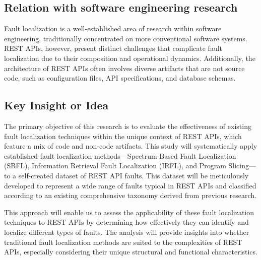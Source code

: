 \documentclass[conference]{IEEEtran}
\newcommand{\todo}[1]{\textcolor{red}{{\bfseries [[#1]]}}}
\begin{document}

\subsection{Relation with software engineering research}

    Fault localization is a well-established area of research within software engineering, traditionally concentrated on more conventional software systems. 
    REST APIs, however, present distinct challenges that complicate fault localization due to their composition and operational dynamics. 
    Additionally, the architecture of REST APIs often involves diverse artifacts that are not source code, such as configuration files, API specifications, and database schemas.



\subsection{Key Insight or Idea}
    The primary objective of this research is to evaluate the effectiveness of existing fault localization techniques within the unique context of REST APIs, which feature a mix of code and non-code artifacts. 
    This study will systematically apply established fault localization methods—Spectrum-Based Fault Localization (SBFL), Information Retrieval Fault Localization (IRFL), and Program Slicing—to a self-created dataset of REST API faults. 
    This dataset will be meticulously developed to represent a wide range of faults typical in REST APIs and classified according to an existing comprehensive taxonomy derived from previous research.

    This approach will enable us to assess the applicability of these fault localization techniques to REST APIs by determining how effectively they can identify and localize different types of faults. 
    The analysis will provide insights into whether traditional fault localization methods are suited to the complexities of REST APIs, especially considering their unique structural and functional characteristics.
\end{document}
